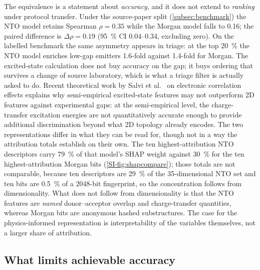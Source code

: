 The equivalence is a statement about \emph{accuracy}, and it does not extend to
\emph{ranking} under protocol transfer. Under the source-paper split
(\cref{subsec:benchmark}) the NTO model retains Spearman $\rho = 0.35$ while the Morgan
model falls to \num{0.16}; the paired difference is
$\Delta\rho = \num{0.19}$ (\qty{95}{\percent} CI \numrange{0.04}{0.34}, excluding
zero). On the labelled benchmark the same asymmetry appears in triage: at the top
\qty{20}{\percent} the NTO model enriches low-gap emitters \num{1.6}-fold against
\num{1.4}-fold for Morgan. The excited-state calculation does not buy accuracy on the
gap; it buys ordering that survives a change of source laboratory, which is what a
triage filter is actually asked to do. Recent theoretical work by Salvi et al.~\cite{Salvi2025} on electronic correlation
effects explains why semi-empirical excited-state features may not outperform 2D features
against experimental gaps: at the semi-empirical level, the charge-transfer excitation
energies are not quantitatively accurate enough to provide additional discrimination
beyond what 2D topology already encodes.
The two representations differ in what they can be read for, though not in a way the
attribution totals establish on their own. The ten highest-attribution NTO descriptors
carry \qty{79}{\percent} of that model's SHAP weight against \qty{30}{\percent} for the
ten highest-attribution Morgan bits (\cref{SI-fig:shapcompare}); those totals are not
comparable, because ten descriptors are \qty{29}{\percent} of the \num{35}-dimensional
NTO set and ten bits are \qty{0.5}{\percent} of a \num{2048}-bit fingerprint, so the
concentration follows from dimensionality. What does not follow from dimensionality is
that the NTO features are \emph{named} donor--acceptor overlap and charge-transfer
quantities, whereas Morgan bits are anonymous hashed substructures. The case for the
physics-informed representation is interpretability of the variables themselves, not a
larger share of attribution.

\subsection{What limits achievable accuracy}\label{subsec:ceilings}

